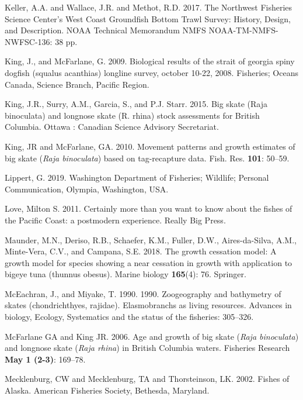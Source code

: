 \documentclass[12pt,]{article}
\begin{document}
\leavevmode\hypertarget{ref-Keller2017}{}%
Keller, A.A. and Wallace, J.R. and Methot, R.D. 2017. The Northwest
Fisheries Science Center's West Coast Groundfish Bottom Trawl Survey:
History, Design, and Description. NOAA Technical Memorandum NMFS
NOAA-TM-NMFS-NWFSC-136: 38 pp.

\leavevmode\hypertarget{ref-KingandMcF2009}{}%
King, J., and McFarlane, G. 2009. Biological results of the strait of
georgia spiny dogfish (squalus acanthias) longline survey, october
10-22, 2008. Fisheries; Oceans Canada, Science Branch, Pacific Region.

\leavevmode\hypertarget{ref-King2015}{}%
King, J.R., Surry, A.M., Garcia, S., and P.J. Starr. 2015. Big skate
(Raja binoculata) and longnose skate (R. rhina) stock assessments for
British Columbia. Ottawa : Canadian Science Advisory Secretariat.

\leavevmode\hypertarget{ref-KingandMcF2010}{}%
King, JR and McFarlane, GA. 2010. Movement patterns and growth estimates
of big skate (\emph{Raja binoculata}) based on tag-recapture data. Fish.
Res. \textbf{101}: 50--59.

\leavevmode\hypertarget{ref-GregLippert}{}%
Lippert, G. 2019. Washington Department of Fisheries; Wildlife; Personal
Communication, Olympia, Washington, USA.

\leavevmode\hypertarget{ref-Love2011}{}%
Love, Milton S. 2011. Certainly more than you want to know about the
fishes of the Pacific Coast: a postmodern experience. Really Big Press.

\leavevmode\hypertarget{ref-maunder2018growth}{}%
Maunder, M.N., Deriso, R.B., Schaefer, K.M., Fuller, D.W.,
Aires-da-Silva, A.M., Minte-Vera, C.V., and Campana, S.E. 2018. The
growth cessation model: A growth model for species showing a near
cessation in growth with application to bigeye tuna (thunnus obesus).
Marine biology \textbf{165}(4): 76. Springer.

\leavevmode\hypertarget{ref-McEachran1990}{}%
McEachran, J., and Miyake, T. 1990. 1990. Zoogeography and bathymetry of
skates (chondrichthyes, rajidae). Elasmobranchs as living resources.
Advances in biology, Ecology, Systematics and the status of the
fisheries: 305--326.

\leavevmode\hypertarget{ref-McFandKing2006}{}%
McFarlane GA and King JR. 2006. Age and growth of big skate (\emph{Raja
binoculata}) and longnose skate (\emph{Raja rhina}) in British Columbia
waters. Fisheries Research \textbf{May 1 (2-3)}: 169--78.

\leavevmode\hypertarget{ref-Mecklenburg2002}{}%
Mecklenburg, CW and Mecklenburg, TA and Thorsteinson, LK. 2002. Fishes
of Alaska. American Fisheries Society, Bethesda, Maryland.
\end{document}

